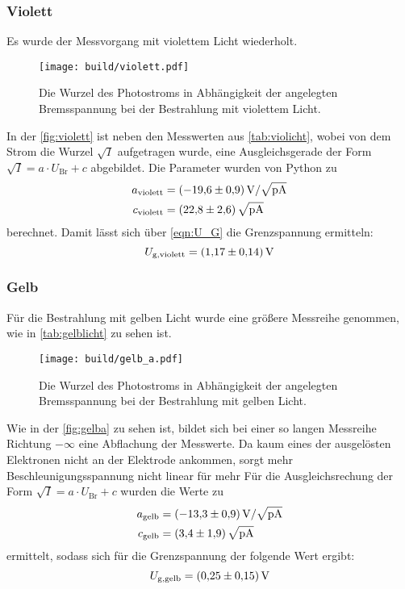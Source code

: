 \subsubsection{Violett}
Es wurde der Messvorgang mit violettem Licht wiederholt.
\begin{figure}[H]
  \texttt{[image: build/violett.pdf]}
  \caption{Die Wurzel des Photostroms in Abhängigkeit der angelegten Bremsspannung bei der Bestrahlung mit violettem Licht.}
  \label{fig:violett}
\end{figure}
\noindent
In der \autoref{fig:violett} ist neben den Messwerten aus \autoref{tab:violicht}, wobei von dem Strom die Wurzel $\sqrt{I}$ aufgetragen wurde, 
eine Ausgleichsgerade der Form $\sqrt{I} = a \cdot U_{\text{Br}} + c $ abgebildet.
Die Parameter wurden von Python zu
\begin{align*}
  a_{\text{violett}} &= \SI{-19.6\pm 0.9}{\volt\per\sqrt{\pico\ampere}}\\
  c_{\text{violett}} &= \SI{22.8 \pm 2.6}{\sqrt{\pico\ampere}}
\end{align*}
berechnet.
Damit lässt sich über \eqref{eqn:U_G} die Grenzspannung ermitteln:
\begin{equation*}
  U_{\text{g},\text{violett}} = \SI{1.17 \pm 0.14}{\volt}
\end{equation*}

\subsubsection{Gelb}
Für die Bestrahlung mit gelben Licht wurde eine größere Messreihe genommen, wie in \autoref{tab:gelblicht} zu sehen ist.
\begin{figure}[H]
  \texttt{[image: build/gelb\_a.pdf]}
  \caption{Die Wurzel des Photostroms in Abhängigkeit der angelegten Bremsspannung bei der Bestrahlung mit gelben Licht.}
  \label{fig:gelba}
\end{figure}
\noindent
Wie in der \autoref{fig:gelba} zu sehen ist, bildet sich bei einer so langen Messreihe Richtung $-\infty$ eine Abflachung der Messwerte.
Da kaum eines der ausgelösten Elektronen nicht an der Elektrode ankommen, sorgt mehr Beschleunigungsspannung nicht linear für mehr 
Für die Ausgleichsrechung der Form $\sqrt{I} = a \cdot U_{\text{Br}} + c $ wurden die Werte zu 
\begin{align*}
  a_{\text{gelb}} &= \SI{-13.3 \pm 0.9}{\volt\per\sqrt{\pico\ampere}}\\
  c_{\text{gelb}} &= \SI{3.4 \pm 1.9}{\sqrt{\pico\ampere}}
\end{align*}
ermittelt, sodass sich für die Grenzspannung der folgende Wert ergibt:
\begin{equation*}
  U_{\text{g},\text{gelb}} = \SI{0.25 \pm 0.15}{\volt}
\end{equation*}

